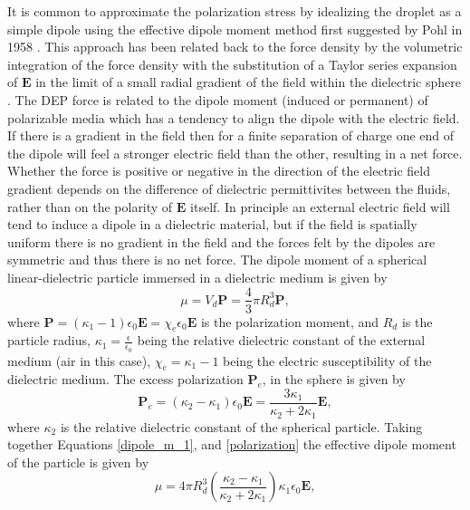 \documentclass[12pt,a4paper,oneside]{book}
\begin{document}
It is common to approximate the polarization stress by idealizing the droplet as a simple dipole using the effective dipole moment method first suggested by Pohl in 1958 \cite{pohl_effects_1958}. This approach has been related back to the force density by the volumetric integration of the force density with the substitution of a Taylor series expansion of $\mathbf{E}$ in the limit of a small radial gradient of the field within the dielectric sphere \cite{wang_general_1997}. The DEP force is related to the dipole moment (induced or permanent) of polarizable media which has a tendency to align the dipole with the electric field. If there is a gradient in the field then for a finite separation of charge one end of the dipole will feel a stronger electric field than the other, resulting in a net force. Whether the force is positive or negative in the direction of the electric field gradient depends on the difference of dielectric permittivites between the fluids, rather than on the polarity of $\mathbf{E}$ itself. In principle an external electric field will tend to induce a dipole in a dielectric material, but if the field is spatially uniform there is no gradient in the field and the forces felt by the dipoles are symmetric and thus there is no net force. The dipole moment of a spherical linear-dielectric particle immersed in a dielectric medium is given by
\begin{equation} \label{dipole_m_1}
\mu = V_d \mathbf{P} = \frac{4}{3} \pi R_d^3 \mathbf{P},
\end{equation} 
where $\mathbf{P} = \left(\kappa_1 - 1 \right) \epsilon_0 \mathbf{E} = \chi_e \epsilon_0 \mathbf{E}$ is the polarization moment, and $R_d$ is the particle radius, $\kappa_1 = \frac{\epsilon}{\epsilon_0}$ being the relative dielectric constant of the external medium (air in this case), $\chi_e = \kappa_1 - 1$ being the electric susceptibility of the dielectric medium. The excess polarization $\mathbf{P}_e$, in the sphere is given by
\begin{equation} \label{polarization}
\mathbf{P}_e = \left( \kappa_2 - \kappa_1 \right) \epsilon_0 \mathbf{E} = \frac{3 \kappa_1}{\kappa_2 +2\kappa_1}\mathbf{E},
\end{equation}
where $\kappa_2$ is the relative dielectric constant of the spherical particle. Taking together Equations \ref{dipole_m_1}, and \ref{polarization} the effective dipole moment of the particle is given by 
\begin{equation}\label{dipole_m_2}
\mu = 4 \pi R_d^3 \left( \frac{\kappa_2 - \kappa_1}{\kappa_2 + 2 \kappa_1} \right) \kappa_1 \epsilon_0 \mathbf{E},
\end{equation}
\end{document}

